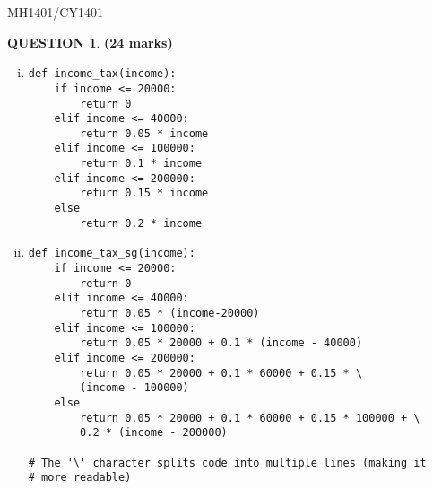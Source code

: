 \documentclass[a4paper,12pt]{article}
\theoremstyle{definition}
\newtheorem{ques}[dummy]{QUESTION}
\theoremstyle{plain}
\newcommand{\py}{python}
\begin{document}
\newpage
\hfill MH1401/CY1401\vspace*{0.5em}
\begin{ques}\hfill \textbf{(24 marks)}\\
	\begin{enumerate}[(i)]
		\item 
		\begin{verbatim}
def income_tax(income):
    if income <= 20000:
        return 0
    elif income <= 40000:
        return 0.05 * income
    elif income <= 100000:
        return 0.1 * income
    elif income <= 200000:
        return 0.15 * income
    else
        return 0.2 * income
		\end{verbatim}
		
		
		\item 
		\begin{verbatim}
def income_tax_sg(income):
    if income <= 20000:
        return 0
    elif income <= 40000:
        return 0.05 * (income-20000)
    elif income <= 100000:
        return 0.05 * 20000 + 0.1 * (income - 40000)
    elif income <= 200000:
        return 0.05 * 20000 + 0.1 * 60000 + 0.15 * \
        (income - 100000)
    else
        return 0.05 * 20000 + 0.1 * 60000 + 0.15 * 100000 + \ 
        0.2 * (income - 200000)

# The '\' character splits code into multiple lines (making it 
# more readable)
		\end{verbatim}
	\end{enumerate}
\end{ques}
\end{document}
